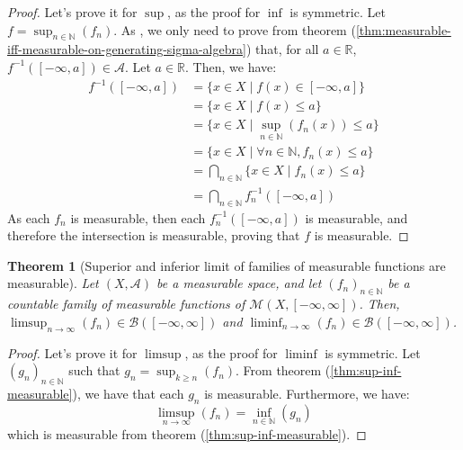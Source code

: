 \documentclass{article}
\newtheorem{theorem}{Theorem}[section]
\theoremstyle{definition}
\theoremstyle{remark}
\theoremstyle{example}
\theoremstyle{notation}
\theoremstyle{axiom}
\begin{document}
\begin{proof}
		Let's prove it for $\sup$, as the proof for $\inf$ is symmetric. Let $f = \sup_{n \in \mathbb{N}}(f_n)$. As , we only need to prove from theorem (\ref{thm:measurable-iff-measurable-on-generating-sigma-algebra}) that, for all $a \in \mathbb{R}$, $f^{-1}([-\infty, a]) \in \mathcal{A}$. Let $a \in \mathbb{R}$. Then, we have:
		\begin{align*}
				f^{-1}([-\infty, a]) &= \{x \in X \mid f(x) \in [-\infty, a]\}\\
									 &= \{x \in X \mid f(x) \leq a\}\\
									 &= \{x \in X \mid \sup_{n \in \mathbb{N}}(f_n(x)) \leq a\}\\
									 &= \{x \in X \mid \forall n \in \mathbb{N}, f_n(x) \leq a\}\\
									 &= \bigcap_{n \in \mathbb{N}} \{x \in X \mid f_n(x) \leq a\}\\
									 &= \bigcap_{n \in \mathbb{N}} f_n^{-1}([-\infty, a])
		\end{align*}
		As each $f_n$ is measurable, then each $f_n^{-1}([-\infty, a])$ is measurable, and therefore the intersection is measurable, proving that $f$ is measurable.	
\end{proof}

\begin{theorem}[Superior and inferior limit of families of measurable functions are measurable] \label{thm:limsup-liminf-measurable} %
		Let $(X, \mathcal{A})$ be a measurable space, and let $(f_n)_{n \in \mathbb{N}}$ be a countable family of measurable functions of $\mathcal{M}(X, [-\infty, \infty])$. Then, $\limsup_{n \rightarrow \infty}(f_n) \in \mathcal{B}([-\infty, \infty])$ and $\liminf_{n \rightarrow \infty}(f_n) \in \mathcal{B}([-\infty, \infty])$.
\end{theorem}

\begin{proof}
		Let's prove it for $\limsup$, as the proof for $\liminf$ is symmetric. Let $(g_n)_{n \in \mathbb{N}}$ such that $g_n = \sup_{k \geq n}(f_n)$. From theorem (\ref{thm:sup-inf-measurable}), we have that each $g_n$ is measurable. Furthermore, we have:
				$$\limsup_{n \rightarrow \infty}(f_n) = \inf_{n \in \mathbb{N}}(g_n)$$
		which is measurable from theorem (\ref{thm:sup-inf-measurable}).
\end{proof}
\end{document}
